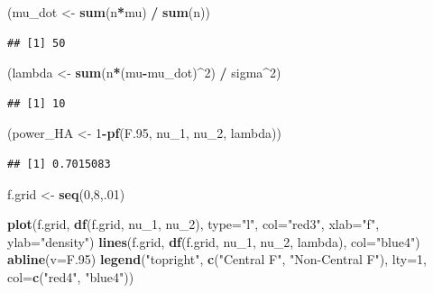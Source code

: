 \documentclass[
]{book}
\newenvironment{Shaded}{\begin{snugshade}}{\end{snugshade}}
\newcommand{\AttributeTok}[1]{\textcolor[rgb]{0.13,0.29,0.53}{#1}}
\newcommand{\DecValTok}[1]{\textcolor[rgb]{0.00,0.00,0.81}{#1}}
\newcommand{\FloatTok}[1]{\textcolor[rgb]{0.00,0.00,0.81}{#1}}
\newcommand{\FunctionTok}[1]{\textcolor[rgb]{0.13,0.29,0.53}{\textbf{#1}}}
\newcommand{\NormalTok}[1]{#1}
\newcommand{\OtherTok}[1]{\textcolor[rgb]{0.56,0.35,0.01}{#1}}
\newcommand{\SpecialCharTok}[1]{\textcolor[rgb]{0.81,0.36,0.00}{\textbf{#1}}}
\newcommand{\StringTok}[1]{\textcolor[rgb]{0.31,0.60,0.02}{#1}}
\begin{document}
\begin{Shaded}
\begin{Highlighting}[]
\NormalTok{(mu\_dot }\OtherTok{\textless{}{-}} \FunctionTok{sum}\NormalTok{(n}\SpecialCharTok{*}\NormalTok{mu) }\SpecialCharTok{/} \FunctionTok{sum}\NormalTok{(n))}
\end{Highlighting}
\end{Shaded}

\begin{verbatim}
## [1] 50
\end{verbatim}

\begin{Shaded}
\begin{Highlighting}[]
\NormalTok{(lambda }\OtherTok{\textless{}{-}} \FunctionTok{sum}\NormalTok{(n}\SpecialCharTok{*}\NormalTok{(mu}\SpecialCharTok{{-}}\NormalTok{mu\_dot)}\SpecialCharTok{\^{}}\DecValTok{2}\NormalTok{) }\SpecialCharTok{/}\NormalTok{ sigma}\SpecialCharTok{\^{}}\DecValTok{2}\NormalTok{) }
\end{Highlighting}
\end{Shaded}

\begin{verbatim}
## [1] 10
\end{verbatim}

\begin{Shaded}
\begin{Highlighting}[]
\NormalTok{(power\_HA }\OtherTok{\textless{}{-}} \DecValTok{1}\SpecialCharTok{{-}}\FunctionTok{pf}\NormalTok{(F}\FloatTok{.95}\NormalTok{, nu\_1, nu\_2, lambda))}
\end{Highlighting}
\end{Shaded}

\begin{verbatim}
## [1] 0.7015083
\end{verbatim}

\begin{Shaded}
\begin{Highlighting}[]
\NormalTok{f.grid }\OtherTok{\textless{}{-}} \FunctionTok{seq}\NormalTok{(}\DecValTok{0}\NormalTok{,}\DecValTok{8}\NormalTok{,.}\DecValTok{01}\NormalTok{)}

\FunctionTok{plot}\NormalTok{(f.grid, }\FunctionTok{df}\NormalTok{(f.grid, nu\_1, nu\_2), }\AttributeTok{type=}\StringTok{"l"}\NormalTok{, }\AttributeTok{col=}\StringTok{"red3"}\NormalTok{,}
     \AttributeTok{xlab=}\StringTok{"f"}\NormalTok{, }\AttributeTok{ylab=}\StringTok{"density"}\NormalTok{)}
\FunctionTok{lines}\NormalTok{(f.grid, }\FunctionTok{df}\NormalTok{(f.grid, nu\_1, nu\_2, lambda), }\AttributeTok{col=}\StringTok{"blue4"}\NormalTok{)}
\FunctionTok{abline}\NormalTok{(}\AttributeTok{v=}\NormalTok{F}\FloatTok{.95}\NormalTok{)}
\FunctionTok{legend}\NormalTok{(}\StringTok{"topright"}\NormalTok{, }\FunctionTok{c}\NormalTok{(}\StringTok{"Central F"}\NormalTok{, }\StringTok{"Non{-}Central F"}\NormalTok{), }\AttributeTok{lty=}\DecValTok{1}\NormalTok{,}
       \AttributeTok{col=}\FunctionTok{c}\NormalTok{(}\StringTok{"red4"}\NormalTok{, }\StringTok{"blue4"}\NormalTok{))}
\end{Highlighting}
\end{Shaded}
\end{document}
